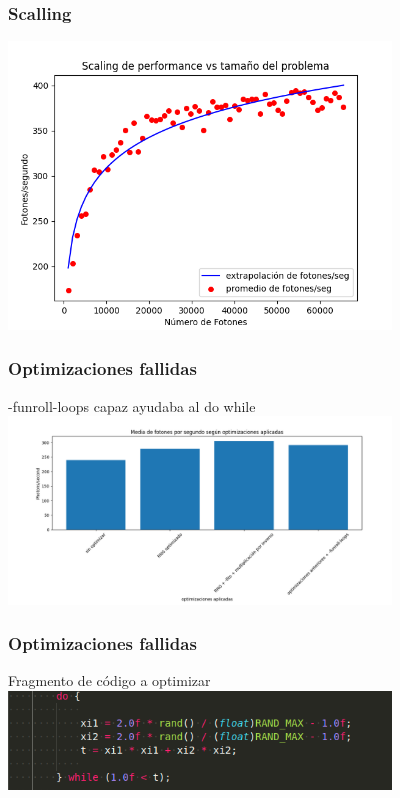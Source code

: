 \documentclass{beamer}
\begin{document}
\begin{frame}
    \frametitle{Scalling}
    \includegraphics[width=4in]{imagenes/scaling.png}    
\end{frame}

\begin{frame}
    \frametitle{Optimizaciones fallidas}

    -funroll-loops capaz ayudaba al do while\\\pause
    \includegraphics[width=4in]{imagenes/fallida1.png}

\end{frame}


\begin{frame}
    \frametitle{Optimizaciones fallidas}

    Fragmento de código a optimizar \\
    \includegraphics[width=4in]{./imagenes/dowhile_optimizar.png}

\end{frame}
\end{document}
